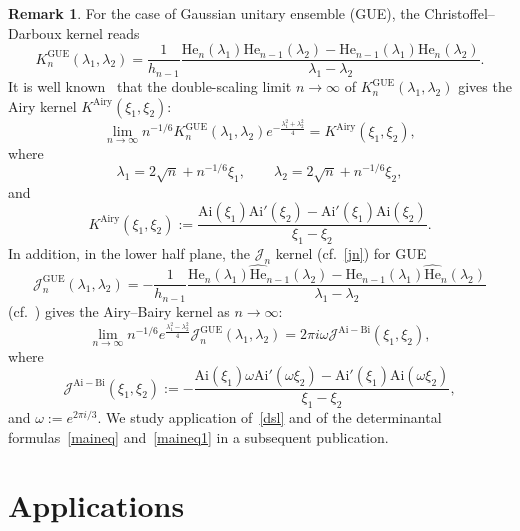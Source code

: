 \documentclass[a4paper]{article}
\theoremstyle{plain}
\theoremstyle{definition}
\newtheorem{remark}{Remark}
\newcommand{\He}{\mathrm{He}}
\begin{document}
\begin{remark}
	For the case of Gaussian unitary ensemble (GUE), the Christoffel--Darboux kernel reads
	\begin{equation}
		K_n^\text{GUE}(\lambda_1,\lambda_2)=\frac{1}{h_{n-1}}\frac{\He_n(\lambda_1)\He_{n-1}(\lambda_2)-\He_{n-1}(\lambda_1)\He_n(\lambda_2)}{\lambda_1-\lambda_2}.
	\end{equation} It is well known~\cite{PR,Szego,Forrester} that the double-scaling limit $n\to\infty$ of $K_n^\text{GUE}(\lambda_1,\lambda_2)$ gives the Airy kernel $K^\text{Airy}(\xi_1,\xi_2)$:
	\begin{equation}
		\lim_{n\to\infty}n^{-1/6}K_n^\mathrm{GUE}(\lambda_1,\lambda_2)e^{-\frac{\lambda_1^2+\lambda_2^2}{4}}=K^\mathrm{Airy}(\xi_1,\xi_2),
	\end{equation}
	where
	\begin{equation}
		\lambda_1=2\sqrt{n}+n^{-1/6}\xi_1,\qquad \lambda_2=2\sqrt{n}+n^{-1/6}\xi_2,
	\end{equation}
	and
	\begin{equation}
		K^\text{Airy}(\xi_1,\xi_2):=\frac{\mathrm{Ai}(\xi_1)\mathrm{Ai}'(\xi_2)-\mathrm{Ai}'(\xi_1)\mathrm{Ai}(\xi_2)}{\xi_1-\xi_2}.
	\end{equation}
	In addition, in the lower half plane, the $\mathcal J_n$ kernel (cf.~\eqref{jn}) for GUE
	\begin{equation}
		\mathcal J_n^\mathrm{GUE}(\lambda_1,\lambda_2)=-\frac{1}{h_{n-1}}\frac{\He_n(\lambda_1)\widehat{\He}_{n-1}(\lambda_2)-\He_{n-1}(\lambda_1)\widehat{\He}_n(\lambda_2)}{\lambda_1-\lambda_2}
	\end{equation}
	(cf.~\cite{Toda,FY}) gives the Airy--Bairy kernel as $n\to\infty$:
	\begin{equation} \label{dsl}
		\lim_{n\to\infty}n^{-1/6}e^{\frac{\lambda_1^2-\lambda_2^2}{4}}\mathcal J_n^\mathrm{GUE}(\lambda_1,\lambda_2)=2\pi i\omega \mathcal J^\mathrm{Ai-Bi}(\xi_1,\xi_2),
	\end{equation} where
	\begin{equation}
		\mathcal J^\mathrm{Ai-Bi}(\xi_1,\xi_2):=-\frac{\mathrm{Ai}(\xi_1)\omega\mathrm{Ai}'(\omega\xi_2)-\mathrm{Ai}'(\xi_1)\mathrm{Ai}(\omega\xi_2)}{\xi_1-\xi_2},
	\end{equation} and $\omega:=e^{2\pi i/3}$.
	We study application of~\eqref{dsl} and of the determinantal formulas~\eqref{maineq} and~\eqref{maineq1} in a subsequent publication.
\end{remark}

\section{Applications}
\end{document}
